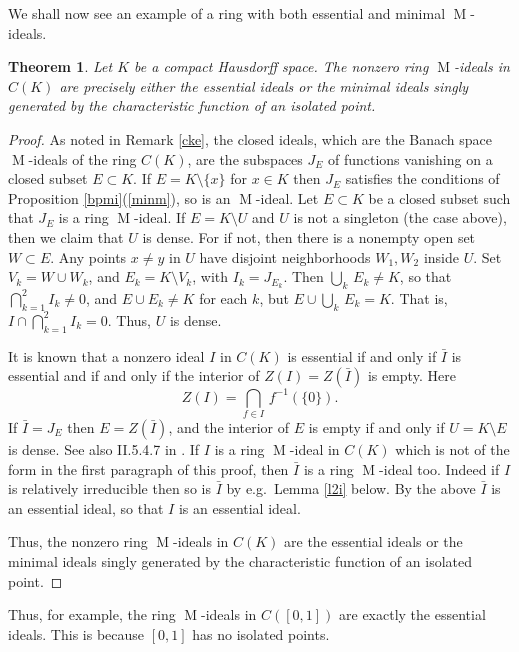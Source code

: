 \documentclass[11pt,leqno]{amsart}
\DeclareMathOperator{\m}{M}
\newtheorem{theorem}{Theorem}[section]
\theoremstyle{definition}
\theoremstyle{remark}
\numberwithin{equation}{section}
\numberwithin{equation}{section}
\begin{document}
We shall now see an example of a ring with both essential and minimal $\m$-ideals.

\begin{theorem}\label{ck} 
Let $K$ be a compact Hausdorff space. 
The nonzero ring $\m$-ideals in $C(K)$ are precisely either the essential ideals or the minimal ideals singly generated by the characteristic function
of an isolated point. 
\end{theorem}
	
\begin{proof} As noted in Remark \ref{cke}, the closed ideals, which are the Banach space $\m$-ideals of the ring $C(K)$, are the subspaces $J_E$ of functions vanishing on a closed subset  $E \subset K$. 
If $E = K \setminus \{ x \}$
for $x \in K$ then $J_E$ satisfies the conditions of Proposition \ref{bpmi}(\ref{minm}), so is an $\m$-ideal.  
Let $E \subset K$ be a closed subset such that 
 $J_E$ is a ring $\m$-ideal.  
If $E =  K \setminus U$ and $U$ is not a singleton (the case 
above), then we claim that $U$ is dense.
For if not, then there is a nonempty open set 
$W \subset E$.   Any points $x \neq y$ in $U$ have disjoint neighborhoods $W_1, W_2$ inside  $U$.  Set $V_k = W \cup W_k$, and $E_k = K \setminus V_k$, with $I_k = J_{E_k}$.  Then $\bigcup_k \, E_k \neq K$, so that 
$\bigcap_{k=1}^2 I_k\neq 0$, and $E \cup E_k \neq K$ for each $k$, but $E \cup \bigcup_k \, E_k = K$. That is, $I \cap \bigcap_{k=1}^2 I_k = 0$.
Thus, $U$ is dense. 

It is known \cite{GJ60}  that a nonzero ideal $I$  in $C(K)$ is essential if and only if $\bar{I}$ is essential and if and only if the interior of $Z(I) = Z(\bar{I})$ is empty. 
Here \[Z(I) = \bigcap_{f \in I} \, f^{-1}(\{ 0 \}).\]   If $\bar{I} = J_E$ then $E = Z(\bar{I})$, and the interior of $E$ is empty if and only if 
$U = K \setminus E$ is dense.   See also II.5.4.7 in \cite{Bla06}. If $I$ is a ring $\m$-ideal in $C(K)$
which is not of the form in the first paragraph of this proof, then 
$\bar{I}$ is a ring $\m$-ideal too.  Indeed if $I$ is relatively irreducible then so is 
$\bar{I}$ by e.g.\ Lemma \ref{l2i} below.
By the above $\bar{I}$ is an essential ideal, so that $I$ is an essential ideal.

Thus, the nonzero ring $\m$-ideals in $C(K)$ are the essential ideals or the minimal ideals singly generated by the characteristic function 
of an isolated point.  
\end{proof}

Thus, for example, the ring $\m$-ideals in $C([0,1])$ are exactly the essential ideals.
This is because $[0,1]$ has no isolated points.
\end{document}
